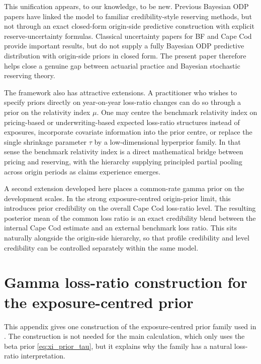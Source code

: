 \documentclass[11pt]{article}
\newcommand{\1}{\mathbf{1}}
\begin{document}
This unification appears, to our knowledge, to be new. Previous Bayesian ODP papers have linked the model to familiar credibility-style reserving methods, but not through an exact closed-form origin-side predictive construction with explicit reserve-uncertainty formulas. Classical uncertainty papers for BF and Cape Cod provide important results, but do not supply a fully Bayesian ODP predictive distribution with origin-side priors in closed form. The present paper therefore helps close a genuine gap between actuarial practice and Bayesian stochastic reserving theory. 


The framework also has attractive extensions. A practitioner who wishes to specify priors directly on year-on-year loss-ratio changes can do so through a prior on the relativity index $\mu$. One may centre the benchmark relativity index on pricing-based or underwriting-based expected loss-ratio structures instead of exposures, incorporate covariate information into the prior centre, or replace the single shrinkage parameter $\tau$ by a low-dimensional hyperprior family. In that sense the benchmark relativity index is a direct mathematical bridge between pricing and reserving, with the hierarchy supplying principled partial pooling across origin periods as claims experience emerges.

A second extension developed here places a common-rate gamma prior on the development scales. In the strong exposure-centred origin-prior limit, this introduces prior credibility on the overall Cape Cod loss-ratio level. The resulting posterior mean of the common loss ratio is an exact credibility blend between the internal Cape Cod estimate and an external benchmark loss ratio. This sits naturally alongside the origin-side hierarchy, 
so that profile credibility and level credibility can be controlled separately within the same model.

\appendix

\section{Gamma loss-ratio construction for the exposure-centred prior}\label{app:gamma_loss_ratio_prior}

This appendix gives one construction of the exposure-centred prior family used in . The construction is not needed for the main calculation, which only uses the beta prior \eqref{eq:xi_prior_tau}, but it explains why the family has a natural loss-ratio interpretation.
\end{document}
